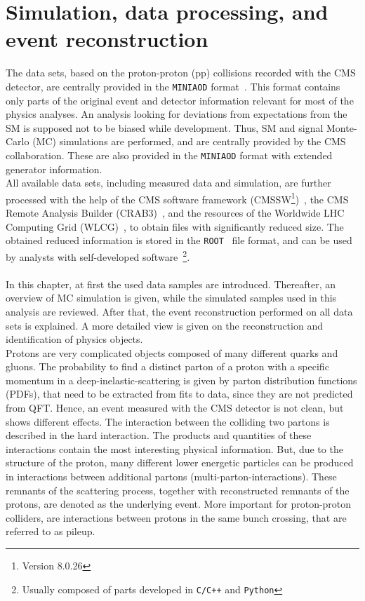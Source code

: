 \chapter{Simulation, data processing, and event reconstruction}\label{chap:reco}
\minitoc
The data sets, based on the proton-proton (pp) collisions recorded with the CMS detector, are centrally provided in the \texttt{MINIAOD} format~\cite{MiniAOD}. This format contains only parts of the original event and detector information relevant for most of the physics analyses. An analysis looking for deviations from expectations from the SM is supposed not to be biased while development. Thus, SM and signal Monte-Carlo (MC) simulations are performed, and are centrally provided by the CMS collaboration. These are also provided in the \texttt{MINIAOD} format with extended generator information.\\
All available data sets, including measured data and simulation, are further processed with the help of the CMS software framework (CMSSW\footnote{Version 8.0.26})~\cite{CMSSW}, the CMS Remote Analysis Builder (CRAB3)~\cite{CRAB}, and the resources of the Worldwide LHC Computing Grid (WLCG)~\cite{Grid}, to obtain files with significantly reduced size. The obtained reduced information is stored in the \texttt{ROOT}~\cite{ROOT} file format, and can be used by analysts with self-developed software~\footnote{Usually composed of parts developed in \texttt{C/C++} and \texttt{Python}}.\\
\\
In this chapter, at first the used data samples are introduced. Thereafter, an overview of MC simulation is given, while the simulated samples used in this analysis are reviewed. After that, the event reconstruction performed on all data sets is explained. A more detailed view is given on the reconstruction and identification of physics objects.\\

Protons are very complicated objects composed of many different quarks and gluons. The probability to find a distinct parton of a proton with a specific momentum in a deep-inelastic-scattering is given by parton distribution functions (PDFs)\cite{PDF}, that need to be extracted from fits to data, since they are not predicted from QFT. Hence, an event measured with the CMS detector is not clean, but shows different effects. The interaction between the colliding two partons is described in the hard interaction. The products and quantities of these interactions contain the most interesting physical information. But, due to the structure of the proton, many different lower energetic particles can be produced in interactions between additional partons (multi-parton-interactions). These remnants of the scattering process, together with reconstructed remnants of the protons, are denoted as the underlying event. More important for proton-proton colliders, are interactions between protons in the same bunch crossing, that are referred to as pileup.

